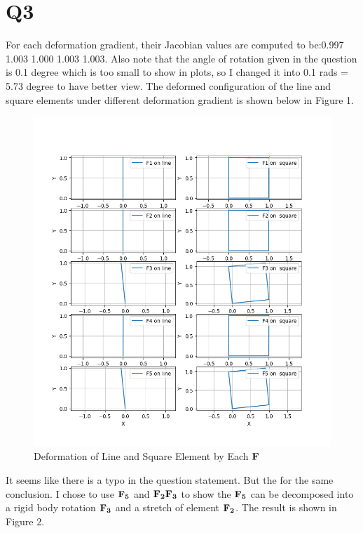 \documentclass[a4paper,12pt]{article} %
\begin{document}
\newpage
\section*{Q3}
For each deformation gradient, their Jacobian values are computed to be:0.997 1.003 1.000 1.003 1.003.
Also note that the angle of rotation given in the question is 0.1 degree which is too small to show in plots, so
I changed it into 0.1 rads = 5.73 degree to have better view.
The deformed configuration of the line and square elements under different deformation gradient is shown below in Figure 1.
    \begin{figure}[htbp]
        \center
        \includegraphics[scale=0.6]{HW2Q3_1.png}
        \caption{Deformation of Line and Square Element by Each $\mathbf{F}$}
    \end{figure}
It seems like there is a typo in the question statement. But the for the same conclusion.
I chose to use $\mathbf{F_5}$ and $\mathbf{F_2F_3}$ to show the $\mathbf{F_5}$ can be decomposed into a rigid 
body rotation $\mathbf{F_3}$ and a stretch of element $\mathbf{F_2}$. The result is shown in Figure 2.
\end{document}
